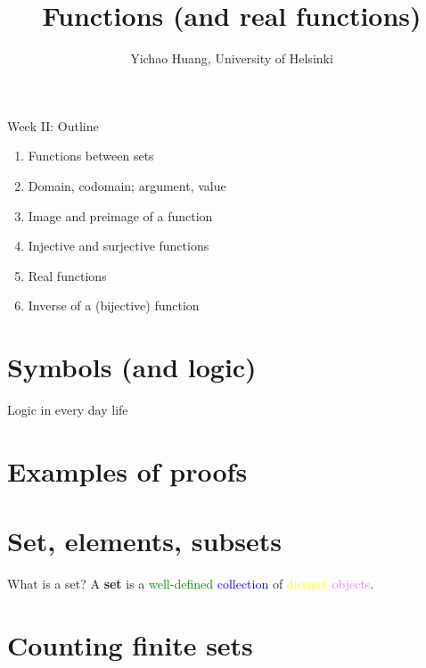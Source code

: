 \documentclass[aspectratio=1610]{beamer}
\title{Functions (and real functions)}
\author{Yichao Huang, University of Helsinki}
\begin{document}
\maketitle

\begin{frame}{Week II: Outline}
\begin{enumerate}
  \item Functions between sets\newline
  \item Domain, codomain; argument, value\newline
  \item Image and preimage of a function\newline
  \item Injective and surjective functions\newline
  \item Real functions\newline
  \item Inverse of a (bijective) function
\end{enumerate}
\end{frame}

\section{Symbols (and logic)}

\begin{frame}{Logic in every day life}
\end{frame}

\section{Examples of proofs}

\section{Set, elements, subsets}

\begin{frame}{What is a set?}
A \textbf{set} is a \textcolor{green}{well-defined} \textcolor{blue}{collection} of \textcolor{yellow}{distinct} \textcolor{violet}{objects}.
\end{frame}

\section{Counting finite sets}
\end{document}

